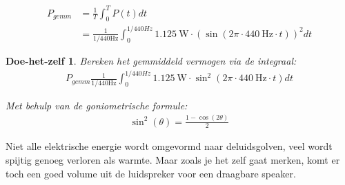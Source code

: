 \documentclass{article}
\newtheorem{DIY}{Doe-het-zelf}
\begin{document}
			\begin{align}
			P_{gemm} &= \frac{1}{T} \int_0^T P(t) dt \\ 
			& = \frac{1}{1/440 \text{Hz}} \int_0^{1/440Hz} 1.125~\text{W} \cdot \left( \sin \left(2\pi \cdot 440~\text{Hz} \cdot t\right) \right)^2 dt
			\end{align}

			\begin{DIY}
				Bereken het gemmiddeld vermogen via de integraal:
				\begin{align*}
				   P_{gemm} \frac{1}{1/440 \text{Hz}} \int_0^{1/440Hz} 1.125~\text{W} \cdot \sin^2 \left(2\pi \cdot 440~\text{Hz} \cdot t\right) dt
				\end{align*}

				Met behulp van de goniometrische formule:
				\begin{align*}
				    \sin^2(\theta) = \frac{1 - \cos(2\theta)}{2}
				 \end{align*}

			\end{DIY}

			Niet alle elektrische energie  wordt omgevormd naar deluidsgolven, veel wordt spijtig genoeg verloren als warmte. Maar zoals je het zelf gaat merken, komt er toch een goed volume uit de luidspreker voor een draagbare speaker.
\end{document}
